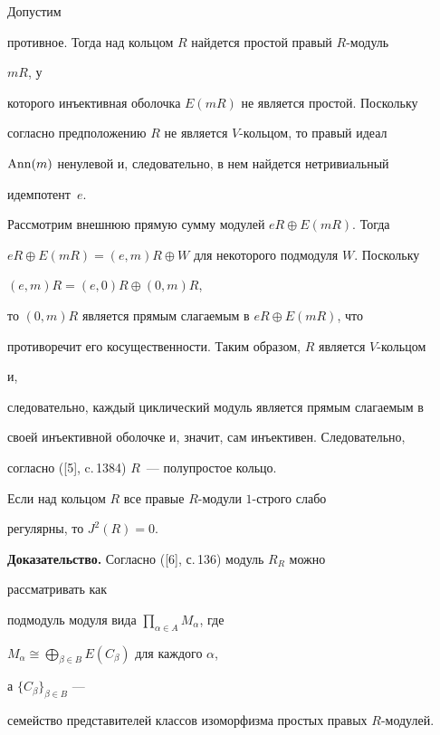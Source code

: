 Допустим  


противное. Тогда над кольцом $R$ найдется простой правый $R$-модуль 


$mR$, у 


которого инъективная оболочка $E(mR)$ не является простой. Поскольку  


согласно предположению $R$ не является $V$-кольцом, то правый идеал  


$\operatorname{Ann}(m)$ ненулевой и, следовательно, в нем найдется нетривиальный  


идемпотент~$e$. 


 


Рассмотрим внешнюю прямую сумму модулей $eR\oplus E(mR)$. Тогда  


$eR\oplus E(mR)=(e,m)R\oplus W$ для некоторого подмодуля $W$. Поскольку 


$(e,m)R=(e,0)R\oplus (0,m)R$, 


то $(0,m)R$ является прямым слагаемым в $eR\oplus E(mR)$, что  


противоречит его косущественности. Таким образом, $R$ является $V$-кольцом 


и,  


следовательно, каждый циклический модуль является прямым слагаемым в  


своей инъективной оболочке и, значит, сам инъективен. Следовательно,  


согласно ([5], c.\,1384) $R$~--- полупростое кольцо. 


 


\begin{lems} 


Если над кольцом $R$ все правые $R$-модули $1$-строго слабо  


регулярны, то $J^2(R){=}0$. 


\end{lems} 


 


{\bf Доказательство.} Согласно ([6], с.\,136) модуль $R_R$ можно 


рассматривать как  


подмодуль модуля вида $\prod\limits_{\alpha\in A}M_\alpha$, где


$M_\alpha\cong \bigoplus\limits_{\beta\in B}E(C_\beta)$ для каждого $\alpha$, 


а $\{C_\beta\}_{\beta\in B}$ --- 


семейство представителей классов изоморфизма простых правых $R$-модулей.  


